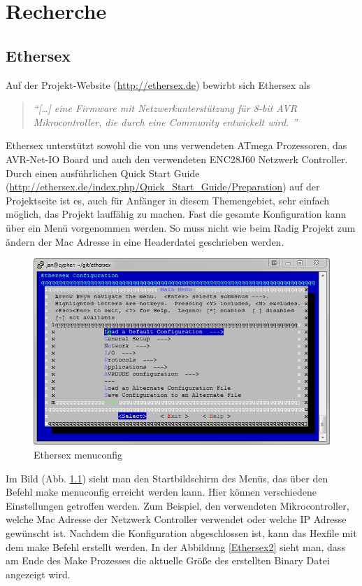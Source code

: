\chapter{Recherche}

\section{Ethersex}

Auf der Projekt-Website (\url{http://ethersex.de}) bewirbt sich Ethersex als
\begin{quote} \textit{
		\enquote{[\ldots] eine Firmware mit Netzwerkunterstützung für 8-bit AVR
		Mikrocontroller, die durch eine Community entwickelt wird.  }
	}
	\cite{Ethersex}
\end{quote}

Ethersex unterstützt sowohl die von uns verwendeten ATmega Prozessoren, das
AVR-Net-IO Board und auch den verwendeten ENC28J60 Netzwerk Controller.
Durch einen ausführlichen Quick Start Guide
(\url{http://ethersex.de/index.php/Quick_Start_Guide/Preparation}) auf der
Projektseite ist es, auch für Anfänger in diesem Themengebiet, sehr einfach möglich, das Projekt lauffähig zu machen. 
Fast die gesamte Konfiguration kann über ein Menü vorgenommen werden. So muss nicht wie beim Radig Projekt zum
ändern der Mac Adresse in eine Headerdatei geschrieben werden. 

\begin{figure}[H]
	\centering
		\includegraphics[width=13cm]{content/pictures/Recherche/Ethersex/Ehtersex1.png}
	\caption{Ethersex menuconfig}
	\label{Ethersex1}
\end{figure} 

Im Bild (Abb. \ref{Ethersex1}) sieht man den Startbildschirm des
Menüs, das über den Befehl \textrm{make menuconfig} erreicht werden kann.
Hier können verschiedene Einstellungen getroffen werden. Zum Beispiel, den
verwendeten Mikrocontroller, welche Mac Adresse der Netzwerk Controller
verwendet oder welche IP Adresse gewünscht ist.
Nachdem die Konfiguration abgeschlossen ist, kann das Hexfile mit dem
\textrm{make} Befehl erstellt werden. In der Abbildung \ref{Ethersex2} sieht man,
dass am Ende des \textrm{Make} Prozesses die aktuelle Größe des erstellten Binary Datei
angezeigt wird.

